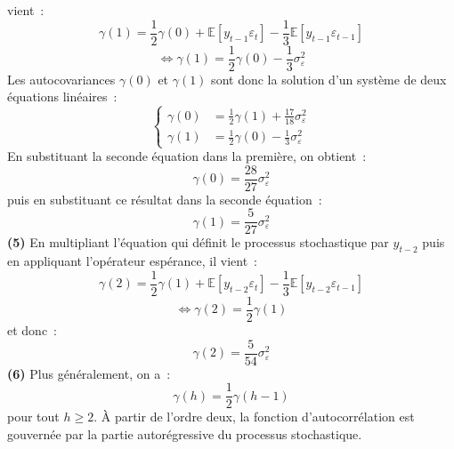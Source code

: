 \documentclass[10pt,a4paper,notitlepage,onecolumn]{article}
\newcommand{\question}[1]{\textbf{(#1)}}
\begin{document}
vient :
\[
\gamma(1) = \frac{1}{2}\gamma(0) + \mathbb E [y_{t-1}\varepsilon_t] - \frac{1}{3} \mathbb E [y_{t-1}\varepsilon_{t-1}]
\]
\[
\Leftrightarrow\gamma(1) = \frac{1}{2}\gamma(0) - \frac{1}{3}\sigma_{\varepsilon}^2
\]
Les autocovariances $\gamma(0)$ et $\gamma(1)$ sont donc la solution d'un système de deux équations linéaires :
\[
\begin{cases}
\gamma(0) &= \frac{1}{2}\gamma(1) + \frac{17}{18}\sigma_{\varepsilon}^2\\  
\gamma(1) &= \frac{1}{2}\gamma(0) - \frac{1}{3}\sigma_{\varepsilon}^2
\end{cases}
\]
En substituant la seconde équation dans la première, on obtient :
\[
\gamma(0) = \frac{28}{27}\sigma_{\varepsilon}^2
\]
puis en substituant ce résultat dans la seconde équation :
\[
\gamma(1) = \frac{5}{27}\sigma_{\varepsilon}^2
\]
\question{5} En  multipliant  l'équation  qui  définit  le  processus
stochastique par  $y_{t-2}$ puis  en appliquant l'opérateur  espérance, il
vient :
\[
\gamma(2) = \frac{1}{2}\gamma(1) + \mathbb E [y_{t-2}\varepsilon_t] - \frac{1}{3} \mathbb E [y_{t-2}\varepsilon_{t-1}]
\]
\[
\Leftrightarrow\gamma(2) = \frac{1}{2}\gamma(1)
\]
et donc :
\[
\gamma(2) = \frac{5}{54}\sigma_{\varepsilon}^2
\]
\question{6} Plus généralement, on a :
\[
\gamma(h) = \frac{1}{2}\gamma(h-1)
\]
pour  tout  $h\geq   2$.  À  partir  de  l'ordre   deux,  la  fonction
d'autocorrélation  est  gouvernée  par  la  partie  autorégressive  du
processus stochastique.\newline

\bigskip
\bigskip
\end{document}
